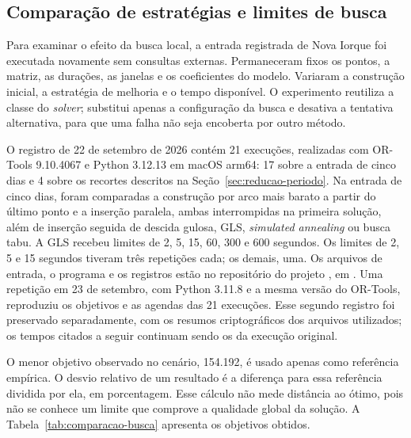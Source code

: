\subsection{Comparação de estratégias e limites de busca}
\label{sec:experimento-busca}

Para examinar o efeito da busca local, a entrada registrada de Nova Iorque foi executada novamente sem consultas externas. Permaneceram fixos os pontos, a matriz, as durações, as janelas e os coeficientes do modelo. Variaram a construção inicial, a estratégia de melhoria e o tempo disponível. O experimento reutiliza a classe do \textit{solver}; substitui apenas a configuração da busca e desativa a tentativa alternativa, para que uma falha não seja encoberta por outro método.

O registro de 22 de setembro de 2026 contém 21 execuções, realizadas com OR-Tools 9.10.4067 e Python 3.12.13 em macOS arm64: 17 sobre a entrada de cinco dias e 4 sobre os recortes descritos na Seção~\ref{sec:reducao-periodo}. Na entrada de cinco dias, foram comparadas a construção por arco mais barato a partir do último ponto e a inserção paralela, ambas interrompidas na primeira solução, além de inserção seguida de descida gulosa, GLS, \textit{simulated annealing} ou busca tabu. A GLS recebeu limites de 2, 5, 15, 60, 300 e 600 segundos. Os limites de 2, 5 e 15 segundos tiveram três repetições cada; os demais, uma. Os arquivos de entrada, o programa e os registros estão no repositório do projeto \cite{interlude2026repositorio}, em . Uma repetição em 23 de setembro, com Python 3.11.8 e a mesma versão do OR-Tools, reproduziu os objetivos e as agendas das 21 execuções. Esse segundo registro foi preservado separadamente, com os resumos criptográficos dos arquivos utilizados; os tempos citados a seguir continuam sendo os da execução original.

O menor objetivo observado no cenário, 154.192, é usado apenas como referência empírica. O desvio relativo de um resultado é a diferença para essa referência dividida por ela, em porcentagem. Esse cálculo não mede distância ao ótimo, pois não se conhece um limite que comprove a qualidade global da solução. A Tabela~\ref{tab:comparacao-busca} apresenta os objetivos obtidos.

